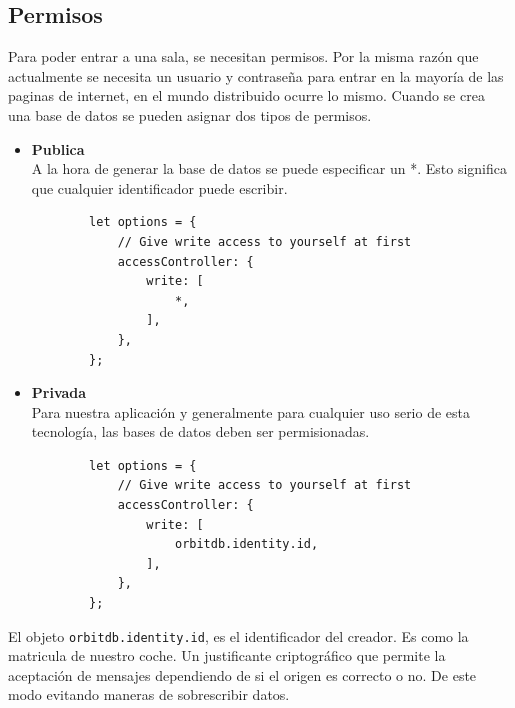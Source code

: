 \subsection{Permisos}
Para poder entrar a una sala, se necesitan permisos. Por la misma razón que actualmente se necesita un usuario y contraseña para entrar en la mayoría de las paginas de internet, en el mundo distribuido ocurre lo mismo.
Cuando se crea una base de datos se pueden asignar dos tipos de permisos.
\begin{itemize}
    \item \textbf{Publica}\\
    A la hora de generar la base de datos se puede especificar un *. Esto significa que cualquier identificador puede escribir.
    \begin{lstlisting}
        let options = {
			// Give write access to yourself at first
			accessController: {
				write: [
					*,
				],
			},
		};
    \end{lstlisting}
    \item \textbf{Privada}\\
    Para nuestra aplicación y generalmente para cualquier uso serio de esta tecnología, las bases de datos deben ser permisionadas.
    \begin{lstlisting}
        let options = {
			// Give write access to yourself at first
			accessController: {
				write: [
					orbitdb.identity.id,
				],
			},
		};
    \end{lstlisting}
\end{itemize}
El objeto \verb|orbitdb.identity.id|, es el identificador del creador. Es como la matricula de nuestro coche. Un justificante criptográfico que permite la aceptación de mensajes dependiendo de si el origen es correcto o no. De este modo evitando maneras de sobrescribir datos.
